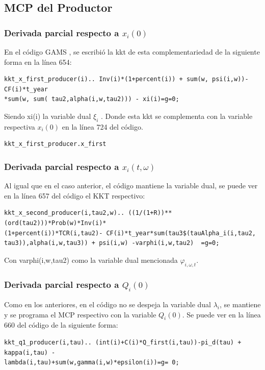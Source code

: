 \subsection{MCP del Productor}

\subsubsection{Derivada parcial respecto a $x_i(0)$}

En el código GAMS , se escribió la kkt de esta complementariedad de la siguiente forma en la línea 654:
\begin{verbatim}
kkt_x_first_producer(i).. Inv(i)*(1+percent(i)) + sum(w, psi(i,w))- CF(i)*t_year
*sum(w, sum( tau2,alpha(i,w,tau2))) - xi(i)=g=0;
\end{verbatim}
Siendo xi(i) la variable dual $\xi_i$ . Donde esta kkt se complementa con la variable respectiva $x_i(0)$ en la línea 724 del código.
\begin{verbatim}
kkt_x_first_producer.x_first
\end{verbatim}

\subsubsection{Derivada parcial respecto a $x_i(t,\omega)$}

Al igual que en el caso anterior, el código mantiene la variable dual, se puede ver en la línea 657 del código el KKT respectivo:

\begin{verbatim}
kkt_x_second_producer(i,tau2,w).. ((1/(1+R))**(ord(tau2)))*Prob(w)*Inv(i)*
(1+percent(i))*TCR(i,tau2)- CF(i)*t_year*sum(tau3$(tauAlpha_i(i,tau2,
tau3)),alpha(i,w,tau3)) + psi(i,w) -varphi(i,w,tau2)  =g=0;
\end{verbatim}

Con varphi(i,w,tau2) como la variable dual mencionada $\varphi_{i,\omega,t}$. 

\subsubsection{Derivada parcial respecto a $Q_i(0)$}

Como en los anteriores, en el código no se despeja la variable dual $\lambda_i$, se mantiene y se programa el MCP respectivo con la variable $Q_i(0)$. Se puede ver en la línea 660 del código de la siguiente forma:

\begin{verbatim}
kkt_q1_producer(i,tau).. (int(i)+C(i)*Q_first(i,tau))-pi_d(tau) + kappa(i,tau) - 
lambda(i,tau)+sum(w,gamma(i,w)*epsilon(i))=g= 0;
\end{verbatim}

